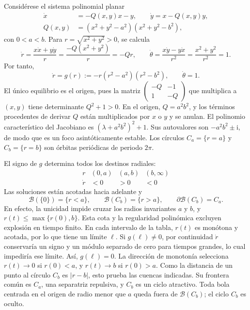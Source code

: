 Considérese el sistema polinomial planar
\begin{equation}
 \begin{aligned}
 \dot x&=-Q(x,y)x-y,\qquad
 \dot y=x-Q(x,y)y,\\
 Q(x,y)&=(x^2+y^2-a^2)(x^2+y^2-b^2),
 \end{aligned}
 \label{eq:guide-hidden-cycle-field}
\end{equation}
con \(0<a<b\). Para \(r=\sqrt{x^2+y^2}>0\), se calcula
\[
 \dot r=\frac{x\dot x+y\dot y}{r}
 =\frac{-Q(x^2+y^2)}r=-Qr,\qquad
 \dot\theta=\frac{x\dot y-y\dot x}{r^2}
 =\frac{x^2+y^2}{r^2}=1.
\]
Por tanto,
\begin{equation}
 \dot r=g(r):=-r(r^2-a^2)(r^2-b^2),
 \qquad \dot\theta=1.
 \label{eq:guide-hidden-cycle-radial}
\end{equation}
El único equilibrio es el origen, pues la matriz
\(\left(\begin{smallmatrix}-Q&-1\\1&-Q\end{smallmatrix}\right)\)
que multiplica a \((x,y)\) tiene determinante \(Q^2+1>0\).
En el origen, \(Q=a^2b^2\), y los términos procedentes de derivar
\(Q\) están multiplicados por \(x\) o \(y\) y se anulan.
El polinomio característico del Jacobiano es
\((\lambda+a^2b^2)^2+1\). Sus autovalores son
\(-a^2b^2\pm\mathrm i\), de modo que es un foco asintóticamente estable.
Los círculos \(C_a=\{r=a\}\) y \(C_b=\{r=b\}\) son órbitas periódicas
de periodo \(2\pi\).

El signo de \(g\) determina todos los destinos radiales:
\[
 \begin{array}{c|ccc}
 r & (0,a)&(a,b)&(b,\infty)\\ \hline
 \dot r&<0&>0&<0
 \end{array}
\]
Las soluciones están acotadas hacia adelante y
\begin{equation}
 \mathcal B(\{0\})=\{r<a\},\qquad
 \mathcal B(C_b)=\{r>a\},\qquad
 \partial\mathcal B(C_b)=C_a.
 \label{eq:guide-hidden-cycle-basins}
\end{equation}
En efecto, la unicidad impide cruzar los radios invariantes \(a\) y \(b\),
y \(r(t)\le\max\{r(0),b\}\). Esta cota y la regularidad polinómica
excluyen explosión en tiempo finito. En cada intervalo de la tabla,
\(r(t)\) es monótona y acotada, por lo que tiene un límite \(\ell\).
Si \(g(\ell)\ne0\), por continuidad \(\dot r\) conservaría un signo y
un módulo separado de cero para tiempos grandes, lo cual impediría ese
límite. Así, \(g(\ell)=0\). La dirección de monotonía selecciona
\(r(t)\to0\) si \(r(0)<a\), y \(r(t)\to b\) si \(r(0)>a\).
Como la distancia de un punto al círculo \(C_b\) es \(|r-b|\), esto
prueba las cuencas indicadas. Su frontera común es \(C_a\), una
separatriz repulsiva, y \(C_b\)
es un ciclo atractivo. Toda bola centrada en el origen de radio menor que
\(a\) queda fuera de \(\mathcal B(C_b)\); el ciclo \(C_b\) es oculto.

